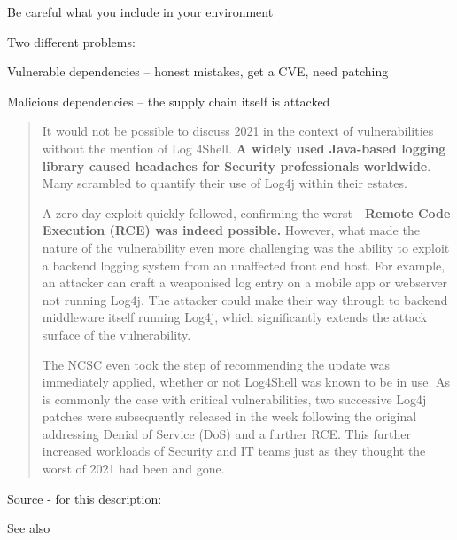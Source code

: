 \documentclass[Screen16to9,17pt]{foils}
\begin{document}
\begin{list2}
\item Be careful what you include in your environment
\item Two different problems:
\begin{list2}
\item Vulnerable dependencies -- honest mistakes, get a CVE, need patching
\item Malicious dependencies -- the supply chain itself is attacked
\end{list2}
\end{list2}


\begin{quote}\small
It would not be possible to discuss 2021 in the context of vulnerabilities without the mention of Log
4Shell. {\bf A widely used Java-based logging library caused headaches for Security professionals worldwide}. Many scrambled to quantify their use of Log4j within their estates.

A zero-day exploit quickly followed, confirming the worst - {\bf Remote Code Execution (RCE) was indeed possible.} However, what made the nature of the vulnerability even more challenging was the ability to exploit a backend logging system from an unaffected front end host. For example, an attacker can craft a weaponised log entry on a mobile app or webserver not running Log4j. The attacker could make their way through to backend middleware itself running Log4j, which significantly extends the attack surface of the vulnerability.

The NCSC even took the step of recommending the update was immediately applied, whether or not Log4Shell was known to be in use. As is commonly the case with critical vulnerabilities, two successive Log4j patches were subsequently released in the week following the original addressing Denial of Service (DoS) and a further RCE. This further increased workloads of Security and IT teams just as they thought the worst of 2021 had been and gone.
\end{quote}
Source - for this description:\\

See also 


\end{document}

